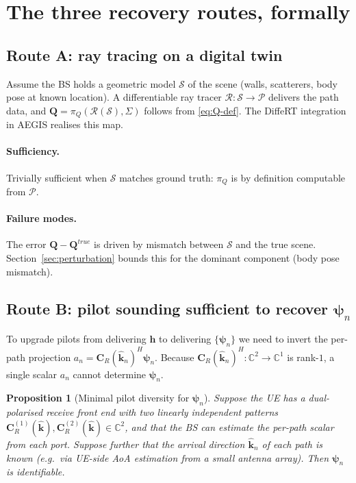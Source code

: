 \documentclass[11pt,a4paper]{article}
\newtheorem{proposition}[theorem]{Proposition}
\theoremstyle{definition}
\newcommand{\hh}{\mathbf{h}}
\newcommand{\kh}{\hat{\mathbf{k}}}
\newcommand{\Q}{\mathbf{Q}}
\newcommand{\Cp}{\mathbf{C}}
\newcommand{\psib}{\boldsymbol{\psi}}
\newcommand{\Sigmaset}{\Sigma}
\newcommand{\C}{\mathbb{C}}
\begin{document}
\section{The three recovery routes, formally}
\label{sec:routes}

\subsection{Route A: ray tracing on a digital twin}

Assume the BS holds a geometric model $\mathcal{S}$ of the scene
(walls, scatterers, body pose at known location). A differentiable ray
tracer $\mathcal{R}:\mathcal{S}\to\mathcal{P}$ delivers the path data,
and $\Q = \pi_Q(\mathcal{R}(\mathcal{S}),\Sigmaset)$ follows from
\eqref{eq:Q-def}. The DiffeRT integration in AEGIS realises this map.

\paragraph{Sufficiency.} Trivially sufficient when $\mathcal{S}$ matches
ground truth: $\pi_Q$ is by definition computable from $\mathcal{P}$.

\paragraph{Failure modes.} The error
$\Q-\Q^{true}$ is driven by mismatch between
$\mathcal{S}$ and the true scene. Section~\ref{sec:perturbation} bounds
this for the dominant component (body pose mismatch).

\subsection{Route B: pilot sounding sufficient to recover \texorpdfstring{$\psib_n$}{psi\_n}}

To upgrade pilots from delivering $\hh$ to delivering $\{\psib_n\}$ we need
to invert the per-path projection
$a_n=\Cp_R(\kh_n)^H\psib_n$. Because $\Cp_R(\kh_n)^H:\C^2\to\C^1$ is
rank-$1$, a single scalar $a_n$ cannot determine $\psib_n$.

\begin{proposition}[Minimal pilot diversity for $\psib_n$]
\label{prop:pilot-diversity}
Suppose the UE has a dual-polarised receive front end with two
linearly independent patterns
$\Cp_R^{(1)}(\kh),\Cp_R^{(2)}(\kh)\in\C^2$, and that the BS can
estimate the per-path scalar from each port. Suppose further that the
arrival direction $\kh_n$ of each path is known (e.g.\ via UE-side AoA
estimation from a small antenna array). Then $\psib_n$ is identifiable.
\end{proposition}
\end{document}

